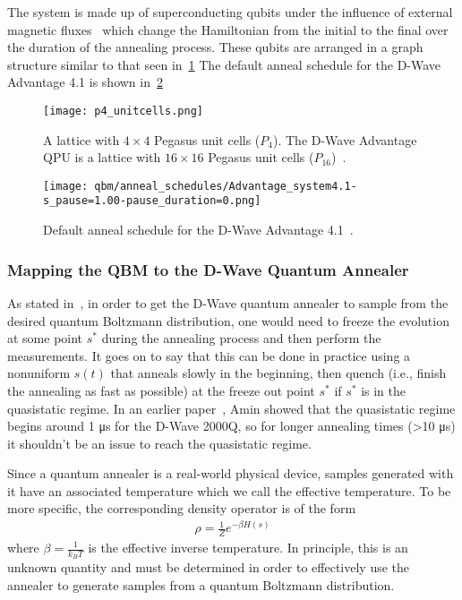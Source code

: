 The system is made up of superconducting qubits under the influence of external magnetic fluxes~\cite{qc_lecture_notes} which change the Hamiltonian from the initial to the final over the duration of the annealing process.
These qubits are arranged in a graph structure similar to that seen in~\cref{fig:p4_unitcells}
The default anneal schedule for the D-Wave Advantage 4.1 is shown in~\cref{fig:anneal_schedule_default}
\begin{figure}[!htb]
    \begin{center}
        \texttt{[image: p4\_unitcells.png]}
    \end{center}
    \caption{A lattice with \( 4 \times 4 \) Pegasus unit cells (\( P_4 \)). The D-Wave Advantage QPU is a lattice with \( 16 \times 16 \) Pegasus unit cells (\( P_{16} \))~\cite{dwave_topologies}.}
    \label{fig:p4_unitcells}
\end{figure}
\begin{figure}[!htb]
    \begin{center}
        \texttt{[image: qbm/anneal\_schedules/Advantage\_system4.1-s\_pause=1.00-pause\_duration=0.png]}
    \end{center}
    \caption{Default anneal schedule for the D-Wave Advantage 4.1~\cite{dwave_anneal_schedules}.}
    \label{fig:anneal_schedule_default}
\end{figure}

\subsubsection{Mapping the QBM to the D-Wave Quantum Annealer}
As stated in~\cite{amin_2018}, in order to get the D-Wave quantum annealer to sample from the desired quantum Boltzmann distribution, one would need to freeze the evolution at some point \( s^* \) during the annealing process and then perform the measurements.
It goes on to say that this can be done in practice using a nonuniform \( s(t) \) that anneals slowly in the beginning, then quench (i.e., finish the annealing as fast as possible) at the freeze out point \( s^* \) if \( s^* \) is in the quasistatic regime.
In an earlier paper~\cite{amin_2015}, Amin showed that the quasistatic regime begins around 1 \si{\micro\second} for the D-Wave 2000Q, so for longer annealing times (>10 \si{\micro\second}) it shouldn't be an issue to reach the quasistatic regime.

Since a quantum annealer is a real-world physical device, samples generated with it have an associated temperature which we call the effective temperature.
To be more specific, the corresponding density operator is of the form
\begin{align}
    \rho = \frac{1}{Z} e^{-\beta H(s)}
\end{align}
where \( \beta = \frac{1}{k_B T} \) is the effective inverse temperature.
In principle, this is an unknown quantity and must be determined in order to effectively use the annealer to generate samples from a quantum Boltzmann distribution.

